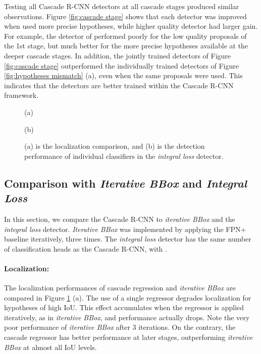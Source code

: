 \documentclass[10pt,twocolumn,letterpaper]{article}
\begin{document}
Testing all Cascade R-CNN detectors at all cascade stages produced
similar observations. Figure \ref{fig:cascade stage} shows that each detector was improved when used more precise hypotheses, while higher quality detector had larger gain. For example, the detector
of  performed poorly for the low quality proposals of the 1st stage,
but much better for the more precise hypotheses available at the deeper
cascade stages. In addition, the jointly trained
detectors of Figure \ref{fig:cascade stage} outperformed the individually
trained detectors of Figure \ref{fig:hypotheses mismatch} (a), even
when the same proposals were used. This indicates that the detectors are
better trained within the Cascade R-CNN framework.

\begin{figure}[!t]
\begin{minipage}[b]{.48\linewidth}
\centering
\centerline{}{(a)}
\end{minipage}
\hfill
\begin{minipage}[b]{.48\linewidth}
\centering
\centerline{}{(b)}
\end{minipage}
\caption{(a) is the localization comparison, and (b) is the detection performance of individual classifiers in the \textit{integral loss} detector.}
\label{fig:localization and integral}
\end{figure}

\subsection{Comparison with \textit{Iterative BBox} and \textit{Integral Loss}}

In this section, we compare the Cascade R-CNN to \textit{iterative BBox} and the \textit{integral loss} detector. \textit{Iterative BBox} was implemented by applying the FPN+ baseline iteratively, three times. The \textit{integral loss} detector has the same number of classification heads as the Cascade R-CNN, with .

\paragraph{Localization:} The localization performances of cascade regression
and \textit{iterative BBox} are compared in Figure \ref{fig:localization and integral} (a). The use of a single regressor degrades localization for hypotheses of high IoU. This effect accumulates when the regressor is applied iteratively, as in \textit{iterative BBox}, and performance actually drops. Note the very poor performance of \textit{iterative BBox} after 3 iterations. On the contrary, the cascade regressor has better performance at later stages, outperforming \textit{iterative BBox} at almost all IoU levels.
\end{document}
